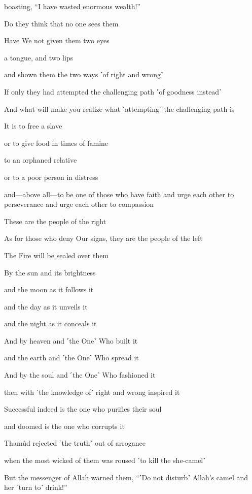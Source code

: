 boasting, “I have wasted enormous wealth!”

Do they think that no one sees them

Have We not given them two eyes

a tongue, and two lips

and shown them the two ways ˹of right and wrong˺

If only they had attempted the challenging path ˹of goodness instead˺

And what will make you realize what ˹attempting˺ the challenging path is

It is to free a slave

or to give food in times of famine

to an orphaned relative

or to a poor person in distress

and—above all—to be one of those who have faith and urge each other to perseverance and urge each other to compassion

These are the people of the right

As for those who deny Our signs, they are the people of the left

The Fire will be sealed over them

By the sun and its brightness

and the moon as it follows it

and the day as it unveils it

and the night as it conceals it

And by heaven and ˹the One˺ Who built it

and the earth and ˹the One˺ Who spread it

And by the soul and ˹the One˺ Who fashioned it

then with ˹the knowledge of˺ right and wrong inspired it

Successful indeed is the one who purifies their soul

and doomed is the one who corrupts it

Thamûd rejected ˹the truth˺ out of arrogance

when the most wicked of them was roused ˹to kill the she-camel˺

But the messenger of Allah warned them, “˹Do not disturb˺ Allah’s camel and her ˹turn to˺ drink!”

